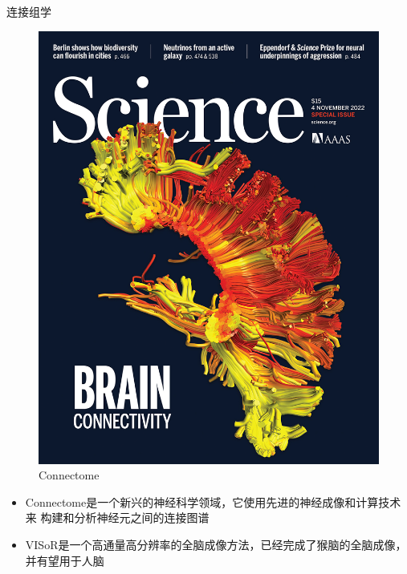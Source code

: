 \documentclass[10pt]{beamer}
\begin{document}
\begin{frame}[fragile]{连接组学}
  \begin{figure}[thbp!]
    \centering
    \includegraphics[width=0.3\linewidth]{imgs/connectome.jpg}
    \caption{Connectome}
    \label{fig:Connectome}
    \end{figure}
  
  \begin{itemize}
    \item Connectome是一个新兴的神经科学领域，它使用先进的神经成像和计算技术来
    构建和分析神经元之间的连接图谱
    \item VISoR是一个高通量高分辨率的全脑成像方法，已经完成了猴脑的全脑成像，并有望用于人脑
  \end{itemize}
\end{frame}
\end{document}
